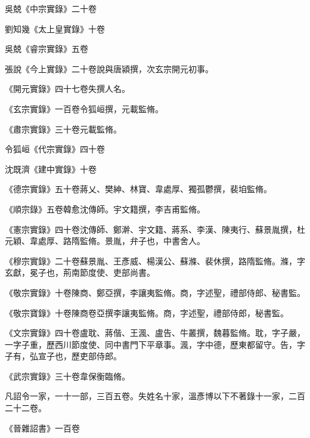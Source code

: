 \begin{pinyinscope}
 吳兢《中宗實錄》二十卷



 劉知幾《太上皇實錄》十卷



 吳兢《睿宗實錄》五卷



 張說《今上實錄》二十卷說與唐潁撰，次玄宗開元初事。



 《開元實錄》四十七卷失撰人名。



 《玄宗實錄》一百卷令狐峘撰，元載監脩。



 《肅宗實錄》三十卷元載監脩。



 令狐峘《代宗實錄》四十卷



 沈既濟《建中實錄》十卷



 《德宗實錄》五十卷蔣乂、樊紳、林寶、韋處厚、獨孤鬱撰，裴垍監脩。



 《順宗錄》五卷韓愈沈傳師。宇文籍撰，李吉甫監脩。



 《憲宗實錄》四十卷沈傳師、鄭澣、宇文籍、蔣系、李漢、陳夷行、蘇景胤撰，杜元穎、韋處厚、路隋監脩。景胤，弁子也，中書舍人。



 《穆宗實錄》二十卷蘇景胤、王彥威、楊漢公、蘇滌、裴休撰，路隋監脩。滌，字玄獻，冕子也，荊南節度使、吏部尚書。



 《敬宗實錄》十卷陳商、鄭亞撰，李讓夷監脩。商，字述聖，禮部侍郎、秘書監。



 《敬宗寶錄》十卷陳商卷亞撰李讓夷監脩。商，字述聖，禮部侍郎，秘書監。



 《文宗實錄》四十卷盧耽、蔣偕、王渢、盧告、牛叢撰，魏暮監脩。耽，字子嚴，一字子重，歷西川節度使、同中書門下平章事。渢，字中德，歷東都留守。告，字子有，弘宣子也，歷吏部侍郎。



 《武宗實錄》三十卷韋保衡臨脩。



 凡詔令一家，一十一部，三百五卷。失姓名十家，溫彥博以下不著錄十一家，二百二十二卷。



 《晉雜詔書》一百卷




\end{pinyinscope}
